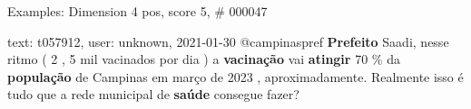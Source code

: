 \begin{frame}{Examples: Dimension 4 pos, score 5, \# 000047}
\footnotesize
\begin{exampleblock}{text: t057912, user: unknown, 2021-01-30}
@campinaspref \textbf{Prefeito} Saadi, nesse ritmo ( 2 , 5 mil vacinados por 
dia ) a \textbf{vacinação} vai \textbf{atingir} 70 \% da \textbf{população} de 
Campinas em março de 2023 , aproximadamente. Realmente isso é tudo que a rede 
municipal de \textbf{saúde} consegue fazer? 
\end{exampleblock}
\end{frame}
